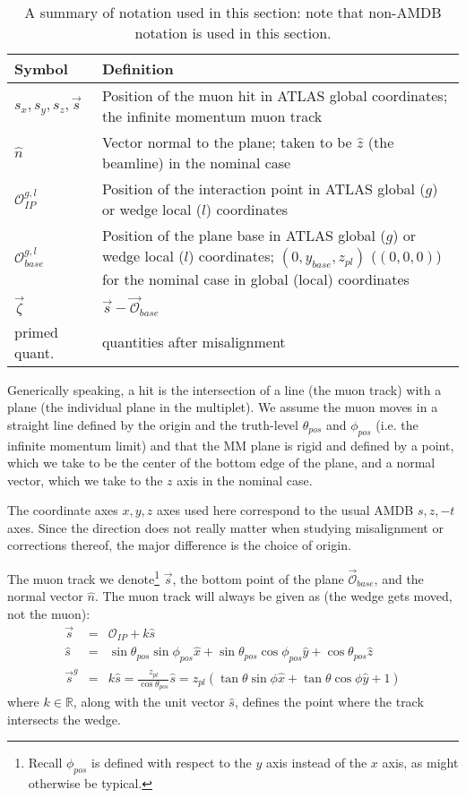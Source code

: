 \begin{table}[htbp]
\caption{A summary of notation used in this section: note that non-AMDB notation is used in this section.
\label{tab:misnotation}}
\begin{center}
\begin{tabular}{|l|p{13 cm}|}
\hline
Symbol & Definition\\
\hline
$s_x,s_y,s_z,\vec{s}$ & Position of the muon hit in ATLAS global coordinates; the infinite momentum muon track\\
\hline
$\hat{n}$ & Vector normal to the plane; taken to be $\hat{z}$ (the beamline) in the nominal case\\
\hline
$\mathscr{O}_{IP}^{g,l}$ & Position of the interaction point in ATLAS global ($g$) or wedge local ($l$) coordinates\\
\hline
$\mathscr{O}_{base}^{g,l}$ & Position of the plane base in ATLAS global ($g$) or wedge local ($l$) coordinates; $\left(0,y_{base},z_{pl}\right)$ ($\left(0,0,0\right)$) for the nominal case in global (local) coordinates\\
\hline
$\vec{\zeta}$ & $\vec{s}-\vec{\mathscr{O}}_{base}$\\
\hline
primed quant. & quantities after misalignment\\
\hline
\end{tabular}
\end{center}
\end{table}

Generically speaking, a hit is the intersection of a line (the muon track) with a plane (the individual plane in the multiplet).  We assume the muon moves in a straight line defined by the origin and the truth-level $\theta_{pos}$ and $\phi_{pos}$ (i.e. the infinite momentum limit) and that the MM plane is rigid and defined by a point, which we take to be the center of the bottom edge of the plane, and a normal vector, which we take to the $z$ axis in the nominal case.

The coordinate axes $x,y,z$ axes used here correspond to the usual AMDB $s,z,-t$ axes.  Since the direction does not really matter when studying misalignment or corrections thereof, the major difference is the choice of origin.

The muon track we denote\footnote{Recall $\phi_{pos}$ is defined with respect to the $y$ axis instead of the $x$ axis, as might otherwise be typical.} $\vec{s}$, the bottom point of the plane $\vec{\mathscr{O}}_{base}$, and the normal vector $\hat{n}$.  The muon track will always be given as (the wedge gets moved, not the muon):
\begin{eqnarray}
\vec{s}&=&\mathscr{O}_{IP}+k\hat{s}\\
\hat{s}&=&\sin\theta_{pos}\sin\phi_{pos}\hat{x}+\sin\theta_{pos}\cos\phi_{pos}\hat{y}+\cos\theta_{pos}\hat{z}\\
\vec{s}^g&=&k\hat{s}=\frac{z_{pl}}{\cos\theta_{pos}}\hat{s}=z_{pl}\left(\tan\theta\sin\phi\hat{x}+\tan\theta\cos\phi\hat{y}+1\right)
\end{eqnarray}
where $k\in\mathbb{R}$, along with the unit vector $\hat{s}$, defines the point where the track intersects the wedge.

